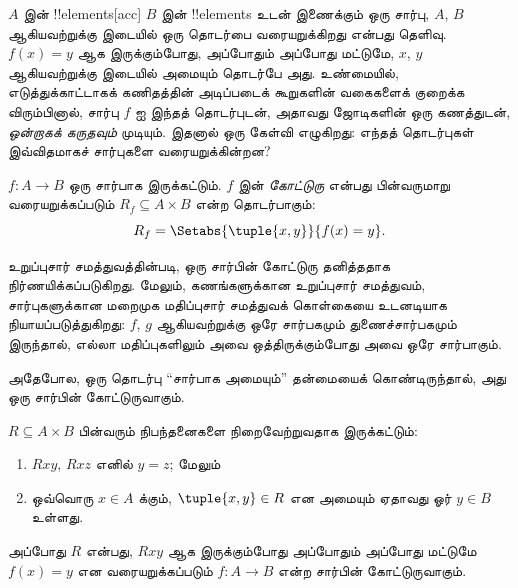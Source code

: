 \documentclass[../../../include/open-logic-section]{subfiles}
\begin{document}


\begin{explain}
$A$ இன் !!{element}s[acc] $B$ இன் !!{element}s உடன் இணைக்கும் ஒரு சார்பு,
$A$, $B$ ஆகியவற்றுக்கு இடையில் ஒரு தொடர்பை வரையறுக்கிறது என்பது தெளிவு.
$f(x) = y$ ஆக இருக்கும்போது, அப்போதும் அப்போது மட்டுமே, $x$, $y$
ஆகியவற்றுக்கு இடையில் அமையும் தொடர்பே அது.
உண்மையில், எடுத்துக்காட்டாகக் கணிதத்தின் அடிப்படைக் கூறுகளின் வகைகளைக்
குறைக்க விரும்பினால், சார்பு $f$ ஐ இந்தத் தொடர்புடன், அதாவது ஜோடிகளின்
ஒரு கணத்துடன், \emph{ஒன்றாகக் கருதவும்} முடியும்.
இதனால் ஒரு கேள்வி எழுகிறது: எந்தத் தொடர்புகள் இவ்விதமாகச் சார்புகளை
வரையறுக்கின்றன?
\end{explain}

\begin{defn}[சார்பின் கோட்டுரு]
$f\colon A \to B$ ஒரு சார்பாக இருக்கட்டும்.
$f$ இன் \emph{கோட்டுரு} என்பது பின்வருமாறு வரையறுக்கப்படும்
$R_f \subseteq A \times B$ என்ற தொடர்பாகும்:
\[
R_f = \Setabs{\tuple{x,y}}{f(x) = y}.
\]
\end{defn}

\begin{explain}
உறுப்புசார் சமத்துவத்தின்படி, ஒரு சார்பின் கோட்டுரு தனித்ததாக
நிர்ணயிக்கப்படுகிறது. மேலும், கணங்களுக்கான உறுப்புசார் சமத்துவம்,
சார்புகளுக்கான மறைமுக மதிப்புசார் சமத்துவக் கொள்கையை உடனடியாக
நியாயப்படுத்துகிறது: $f$, $g$ ஆகியவற்றுக்கு ஒரே சார்பகமும்
துணைச்சார்பகமும் இருந்தால், எல்லா மதிப்புகளிலும் அவை ஒத்திருக்கும்போது
அவை ஒரே சார்பாகும்.

அதேபோல, ஒரு தொடர்பு “சார்பாக அமையும்” தன்மையைக் கொண்டிருந்தால்,
அது ஒரு சார்பின் கோட்டுருவாகும்.
\end{explain}

\begin{prop}
$R \subseteq A \times B$ பின்வரும் நிபந்தனைகளை நிறைவேற்றுவதாக இருக்கட்டும்:
\begin{enumerate}
\item $Rxy$, $Rxz$ எனில் $y = z$; மேலும்
\item ஒவ்வொரு $x \in A$ க்கும், $\tuple{x,
y} \in R$ என அமையும் ஏதாவது ஓர் $y \in B$ உள்ளது.
\end{enumerate}
அப்போது $R$ என்பது, $Rxy$ ஆக இருக்கும்போது அப்போதும் அப்போது மட்டுமே
$f(x) = y$ என வரையறுக்கப்படும் $f\colon A \to B$ என்ற சார்பின் கோட்டுருவாகும்.
\end{prop}
\end{document}
